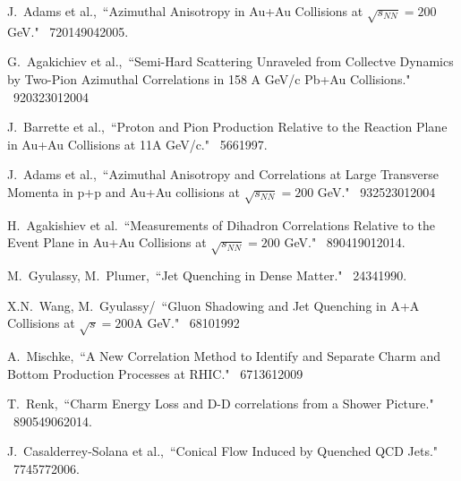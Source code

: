 \begin{thebibliography}{1000}
J.~Adams et al.,~``Azimuthal Anisotropy in Au+Au Collisions at $\sqrt{s_{NN}} = 200$ GeV." \Journal{\PRC} {~72}{014904}{2005}.

G.~Agakichiev et al.,~``Semi-Hard Scattering Unraveled from Collectve Dynamics by Two-Pion Azimuthal Correlations in 158 A GeV/c Pb+Au Collisions." \Journal{\PRL} {~92}{032301}{2004}

J.~Barrette et al.,~``Proton and Pion Production Relative to the Reaction Plane in Au+Au Collisions at 11A GeV/c." \Journal{\PRC} {~56}{6}{1997}.

J.~Adams et al.,~``Azimuthal Anisotropy and Correlations at Large Transverse Momenta in p+p and Au+Au collisions at $\sqrt{s_{NN}} = 200$ GeV." \Journal{\PRL} {~93}{252301}{2004}

H.~Agakishiev et al.~``Measurements of Dihadron Correlations Relative to the Event Plane in Au+Au Collisions at $\sqrt{s_{NN}} = 200$ GeV." \Journal{\PRC} {~89}{041901}{2014}.


M.~Gyulassy, M.~Plumer,~``Jet Quenching in Dense Matter." \Journal{\PLB} {~243}{4}{1990}.

X.N.~Wang, M.~Gyulassy/~``Gluon Shadowing and Jet Quenching in A+A Collisions at $\sqrt{s} = 200$A GeV." \Journal{\PRL} {~68}{10}{1992}

A.~Mischke,~``A New Correlation Method to Identify and Separate Charm and Bottom Production Processes at RHIC." \Journal{\PLB} {~671}{361}{2009}

T.~Renk,~``Charm Energy Loss and D-D correlations from a Shower Picture." \Journal{\PRC} {~89}{054906}{2014}.

J.~Casalderrey-Solana et al.,~``Conical Flow Induced by Quenched QCD Jets." \Journal{\NPA} {~774}{577}{2006}.

\end{thebibliography}
